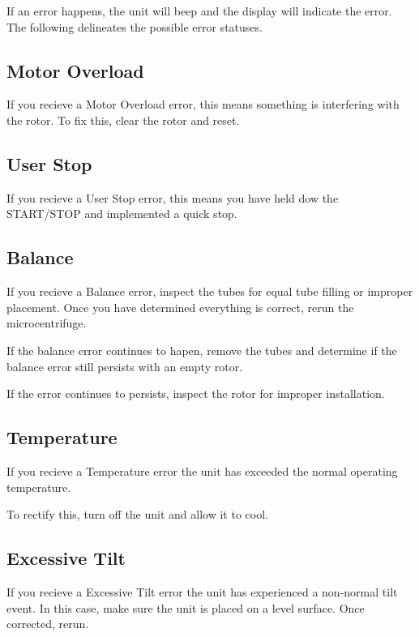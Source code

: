 \documentclass[12pt]{../SOP3_beta}
\begin{document}
\NP If an error happens, the unit will beep and the display will indicate the error. The following delineates the possible error statuses. 

\subsection*{Motor Overload}

\NP If you recieve a Motor Overload error, this means something is interfering with the rotor. To fix this, clear the rotor and reset. 

\subsection*{User Stop}

\NP If you recieve a User Stop error, this means you have held dow the START/STOP and implemented a quick stop.

\subsection*{Balance}

\NP If you recieve a Balance error, inspect the tubes for equal tube filling or improper placement. Once you have determined everything is correct, rerun the microcentrifuge. 

\NP If the balance error continues to hapen, remove the tubes and determine if the balance error still persists with an empty rotor.

\NP If the error continues to persists, inspect the rotor for improper installation. 

\subsection*{Temperature}

\NP If you recieve a Temperature error the unit has exceeded the normal operating temperature. 

\NP To rectify this, turn off the unit and allow it to cool. 

\subsection*{Excessive Tilt}

\NP If you recieve a Excessive Tilt error the unit has experienced a non-normal tilt event. In this case, make sure the unit is placed on a level surface. Once corrected, rerun. 
\end{document}
